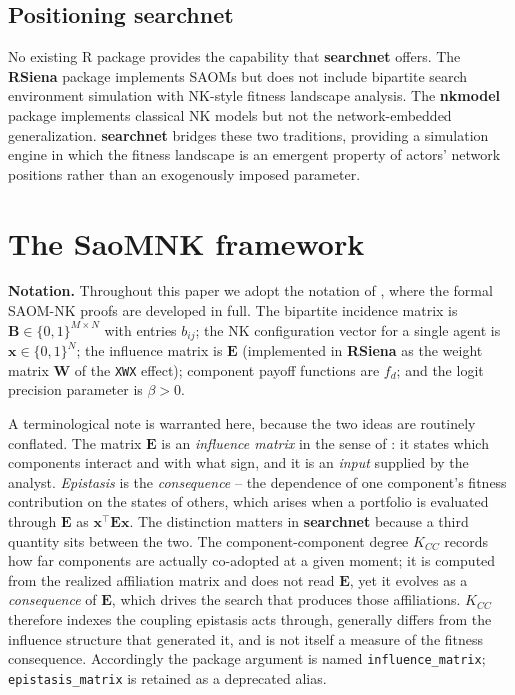 \documentclass[
]{article}
\begin{document}
\subsection{\texorpdfstring{Positioning
\textbf{searchnet}}{Positioning }}\label{positioning}

No existing \textsf{R} package provides the capability that
\textbf{searchnet} offers. The \textbf{RSiena} package
\citep{Ripley2022} implements SAOMs but does not include bipartite
search environment simulation with NK-style fitness landscape analysis.
The \textbf{nkmodel} package \citep{Baumann2019nk} implements classical
NK models but not the network-embedded generalization.
\textbf{searchnet} bridges these two traditions, providing a simulation
engine in which the fitness landscape is an emergent property of actors'
network positions rather than an exogenously imposed parameter.

\section{The SaoMNK framework}\label{sec:framework}

\noindent \textbf{Notation.} Throughout this paper we adopt the notation
of \citet{downing2026architecture}, where the formal SAOM-NK proofs are
developed in full. The bipartite incidence matrix is
\(\mathbf{B} \in \{0,1\}^{M \times N}\) with entries \(b_{ij}\); the NK
configuration vector for a single agent is \(\mathbf{x} \in \{0,1\}^N\);
the influence matrix is \(\mathbf{E}\) (implemented in \textbf{RSiena}
as the weight matrix \(\mathbf{W}\) of the \texttt{XWX} effect);
component payoff functions are \(f_d\); and the logit precision
parameter is \(\beta > 0\).

A terminological note is warranted here, because the two ideas are
routinely conflated. The matrix \(\mathbf{E}\) is an \emph{influence
matrix} in the sense of \citet{RivkinSiggelkow2007}: it states which
components interact and with what sign, and it is an \emph{input}
supplied by the analyst. \emph{Epistasis} is the \emph{consequence} --
the dependence of one component's fitness contribution on the states of
others, which arises when a portfolio is evaluated through
\(\mathbf{E}\) as \(\mathbf{x}^{\top}\mathbf{E}\mathbf{x}\). The
distinction matters in \textbf{searchnet} because a third quantity sits
between the two. The component-component degree \(K_{CC}\) records how
far components are actually co-adopted at a given moment; it is computed
from the realized affiliation matrix and does not read \(\mathbf{E}\),
yet it evolves as a \emph{consequence} of \(\mathbf{E}\), which drives
the search that produces those affiliations. \(K_{CC}\) therefore
indexes the coupling epistasis acts through, generally differs from the
influence structure that generated it, and is not itself a measure of
the fitness consequence. Accordingly the package argument is named
\texttt{influence\_matrix}; \texttt{epistasis\_matrix} is retained as a
deprecated alias.
\end{document}
